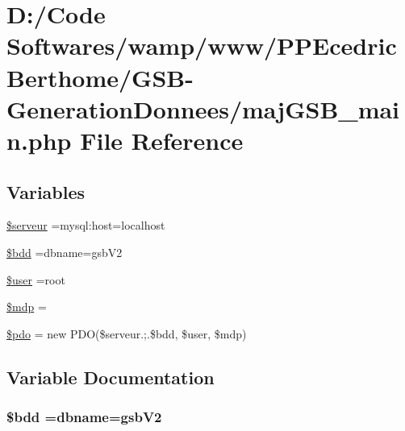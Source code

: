 \hypertarget{maj_g_s_b__main_8php}{}\section{D\+:/\+Code Softwares/wamp/www/\+P\+P\+Ecedric\+Berthome/\+G\+S\+B-\/\+Generation\+Donnees/maj\+G\+S\+B\+\_\+main.php File Reference}
\label{maj_g_s_b__main_8php}
\subsection*{Variables}
\begin{DoxyCompactItemize}
\item 
\hyperlink{maj_g_s_b__main_8php_a4ffb9d7258acf24e1ff550bceba60ed2}{\$serveur} =\textquotesingle{}mysql\+:host=localhost\textquotesingle{}
\item 
\hyperlink{maj_g_s_b__main_8php_a94f91e878bce0991e2cd595c5dd79b3f}{\$bdd} =\textquotesingle{}dbname=gsb\+V2\textquotesingle{}
\item 
\hyperlink{maj_g_s_b__main_8php_a598ca4e71b15a1313ec95f0df1027ca5}{\$user} =\textquotesingle{}root\textquotesingle{}
\item 
\hyperlink{maj_g_s_b__main_8php_a8a65334de2f0d486a42b02ecf82fe8fb}{\$mdp} =\textquotesingle{}\textquotesingle{}
\item 
\hyperlink{maj_g_s_b__main_8php_a5766efd703cef0e00bfc06b3f3acbe0e}{\$pdo} = new P\+DO(\$serveur.\textquotesingle{};\textquotesingle{}.\$bdd, \$user, \$mdp)
\end{DoxyCompactItemize}


\subsection{Variable Documentation}
\subsubsection[{\texorpdfstring{\$bdd}{$bdd}}]{\setlength{\rightskip}{0pt plus 5cm}\$bdd =\textquotesingle{}dbname=gsb\+V2\textquotesingle{}}\hypertarget{maj_g_s_b__main_8php_a94f91e878bce0991e2cd595c5dd79b3f}{}\label{maj_g_s_b__main_8php_a94f91e878bce0991e2cd595c5dd79b3f}
